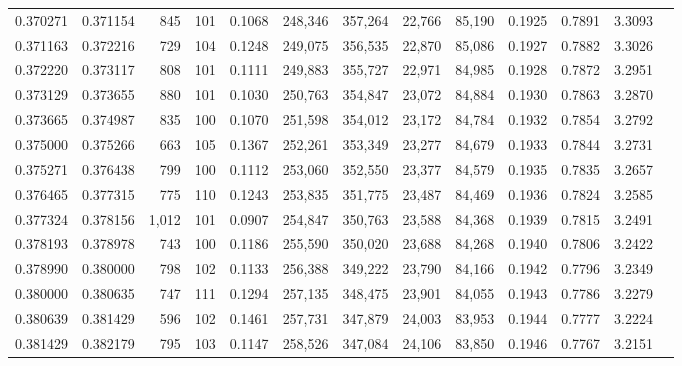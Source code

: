 \begin{tabular}{rrrrrrrrrrrrr}
0.370271 & 0.371154 &    845 &   101 &                                     0.1068 & 248,346 & 357,264 &  22,766 &  85,190 & 0.1925 & 0.7891 & 3.3093 \\
0.371163 & 0.372216 &    729 &   104 &                                     0.1248 & 249,075 & 356,535 &  22,870 &  85,086 & 0.1927 & 0.7882 & 3.3026 \\
0.372220 & 0.373117 &    808 &   101 &                                     0.1111 & 249,883 & 355,727 &  22,971 &  84,985 & 0.1928 & 0.7872 & 3.2951 \\
0.373129 & 0.373655 &    880 &   101 &                                     0.1030 & 250,763 & 354,847 &  23,072 &  84,884 & 0.1930 & 0.7863 & 3.2870 \\
0.373665 & 0.374987 &    835 &   100 &                                     0.1070 & 251,598 & 354,012 &  23,172 &  84,784 & 0.1932 & 0.7854 & 3.2792 \\
0.375000 & 0.375266 &    663 &   105 &                                     0.1367 & 252,261 & 353,349 &  23,277 &  84,679 & 0.1933 & 0.7844 & 3.2731 \\
0.375271 & 0.376438 &    799 &   100 &                                     0.1112 & 253,060 & 352,550 &  23,377 &  84,579 & 0.1935 & 0.7835 & 3.2657 \\
0.376465 & 0.377315 &    775 &   110 &                                     0.1243 & 253,835 & 351,775 &  23,487 &  84,469 & 0.1936 & 0.7824 & 3.2585 \\
0.377324 & 0.378156 &  1,012 &   101 &                                     0.0907 & 254,847 & 350,763 &  23,588 &  84,368 & 0.1939 & 0.7815 & 3.2491 \\
0.378193 & 0.378978 &    743 &   100 &                                     0.1186 & 255,590 & 350,020 &  23,688 &  84,268 & 0.1940 & 0.7806 & 3.2422 \\
0.378990 & 0.380000 &    798 &   102 &                                     0.1133 & 256,388 & 349,222 &  23,790 &  84,166 & 0.1942 & 0.7796 & 3.2349 \\
0.380000 & 0.380635 &    747 &   111 &                                     0.1294 & 257,135 & 348,475 &  23,901 &  84,055 & 0.1943 & 0.7786 & 3.2279 \\
0.380639 & 0.381429 &    596 &   102 &                                     0.1461 & 257,731 & 347,879 &  24,003 &  83,953 & 0.1944 & 0.7777 & 3.2224 \\
0.381429 & 0.382179 &    795 &   103 &                                     0.1147 & 258,526 & 347,084 &  24,106 &  83,850 & 0.1946 & 0.7767 & 3.2151 \\

\end{tabular}
